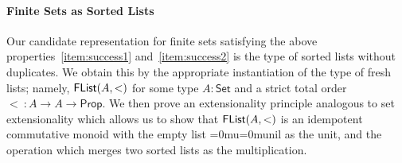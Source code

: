 \documentclass[a4paper]{easychair}
\newtheorem{theorem}{Theorem}
\newtheorem{definition}{Definition}
\newcommand{\AgdaFontStyle}[1]{\textsf{#1}}
\newcommand{\AgdaBoundFontStyle}[1]{\textit{#1}}
\newcommand{\AgdaFormat}[2]{#2}
\newcommand{\AgdaNoSpaceMath}[1]
    {\begingroup\thickmuskip=0mu\medmuskip=0mu#1\endgroup}
\newcommand{\AgdaBound}[1]
    {\AgdaNoSpaceMath{\textcolor{AgdaBound}{\AgdaBoundFontStyle{\AgdaFormat{#1}{#1}}}}}
\newcommand{\AgdaDatatype}[1]
    {\AgdaNoSpaceMath{\textcolor{AgdaDatatype}{\AgdaFontStyle{\AgdaFormat{#1}{{#1}}}}}}
\newcommand{\AgdaInductiveConstructor}[1]
    {\AgdaNoSpaceMath{\textcolor{AgdaInductiveConstructor}{\AgdaFontStyle{\AgdaFormat{#1}{{#1}}}}}}
\newcommand\bv[1]{{\AgdaBound{$#1$}}}
\newcommand\ty[1]{\AgdaDatatype{$#1$}}
\newcommand{\flistsymb}{\AgdaDatatype{FList}}
\newcommand{\flist}[2]{\ensuremath{\flistsymb(#1,#2)}}
\newcommand{\freshfor}{\AgdaDatatype{\#}}
\newcommand\nil{\AgdaInductiveConstructor{nil}}
\newcommand\cons{\AgdaInductiveConstructor{cons}}
\newcommand\nilF{\AgdaInductiveConstructor{nil$_{\#}$}}
\newcommand\consF{\AgdaInductiveConstructor{cons$_{\#}$}}
\newcommand\univ{\mathsf{Type}} %
\newcommand\setuniv{\mathsf{Set}} %
\newcommand\propuniv{\mathsf{Prop}} %
\begin{document}


\paragraph{Finite Sets as Sorted Lists}
Our candidate representation for finite sets satisfying the above properties~\eqref{item:success1} and~\eqref{item:success2} is the type of sorted lists without duplicates.
We obtain this by the appropriate instantiation of the type of fresh lists;
namely, \flist{A}{<} for some type $A : \setuniv$ and a strict total order $< \  : A \to A \to \propuniv$.
We then prove an extensionality principle analogous to set extensionality which allows us to show that \flist{A}{<} is an idempotent commutative monoid
with the empty list \nil{} as the unit,
and the operation which merges two sorted lists as the multiplication.

\end{document}
